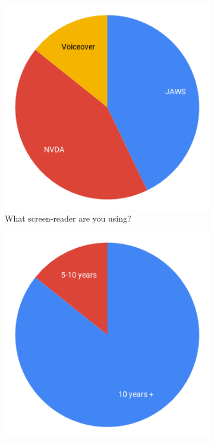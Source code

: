 \documentclass[ %
                    author={Aleena Baig},
                supervisor={Dr Simon Lock},
                    degree={BSc},
                     title={On Making Web Accessible Graphs},
                  subtitle={},
                      year={2019} ]{dissertation}
\begin{document}
\begin{figure}[H]
  \centering
  \begin{subfigure}[c]{0.3\linewidth}
    \centering
    \includegraphics[width=\linewidth]{images/ScreenReader.png}
     \caption{What screen-reader are you using?}
  \end{subfigure}
  \begin{subfigure}[c]{0.3\linewidth}
    \centering
    \includegraphics[width=\linewidth]{images/HowLongUsingScreenReader.png}

\end{subfigure}
\end{figure}
\end{document}
